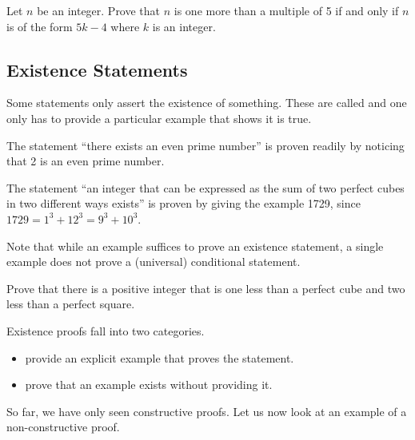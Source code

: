 \begin{exercise}
    Let $n$ be an integer. Prove that $n$ is one more than a multiple of 5 if and only if $n$ is of the form $5k - 4$ where $k$ is an integer.
\end{exercise}

\subsection{Existence Statements}
Some statements only assert the existence of something. These are called  and one only has to provide a particular example that shows it is true.

\begin{example}
    The statement ``there exists an even prime number'' is proven readily by noticing that 2 is an even prime number.
\end{example}

\begin{example}
    The statement ``an integer that can be expressed as the sum of two perfect cubes in two different ways exists'' is proven by giving the example 1729, since $1729 = 1^3 + 12^3 = 9^3 + 10^3$.
\end{example}

Note that while an example suffices to prove an existence statement, a single example does not prove a (universal) conditional statement.

\begin{exercise}
    Prove that there is a positive integer that is one less than a perfect cube and two less than a perfect square.
\end{exercise}

Existence proofs fall into two categories.
\begin{itemize}
    \item {} provide an explicit example that proves the statement.
    \item {} prove that an example exists without providing it.
\end{itemize}
So far, we have only seen constructive proofs. Let us now look at an example of a non-constructive proof.

